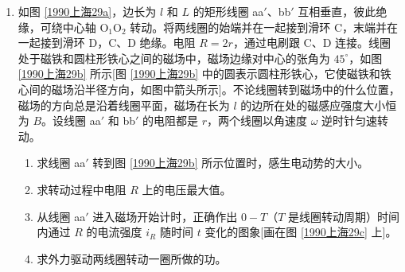 \documentclass[\gkver]{gaokaozhenti}
\begin{document}
\begin{enumerate}
\item
如图 \ref{1990上海29a}，边长为 $l$ 和 $L$ 的矩形线圈 aa$'$、bb$'$ 互相垂直，彼此绝缘，可绕中心轴 O$_{1}$O$_{2}$ 转动。将两线圈的始端并在一起接到滑环 C，末端并在一起接到滑环 D，C、D 绝缘。电阻 $R=2r$，通过电刷跟 C、D 连接。线圈处于磁铁和圆柱形铁心之间的磁场中，磁场边缘对中心的张角为 $45^{\circ}$，如图 \ref{1990上海29b} 所示[图 \ref{1990上海29b} 中的圆表示圆柱形铁心，它使磁铁和铁心间的磁场沿半径方向，如图中箭头所示]。不论线圈转到磁场中的什么位置，磁场的方向总是沿着线圈平面，磁场在长为 $l$ 的边所在处的磁感应强度大小恒为 $B$。设线圈 aa$'$ 和 bb$'$ 的电阻都是 $r$，两个线圈以角速度 $\omega$ 逆时针匀速转动。
\begin{enumerate}
	\item
	求线圈 aa$'$ 转到图 \ref{1990上海29b} 所示位置时，感生电动势的大小。
	\item
	求转动过程中电阻 $R$ 上的电压最大值。
	\item
	从线圈 aa$'$ 进入磁场开始计时，正确作出 $0-T$（$T$ 是线圈转动周期）时间内通过 $R$ 的电流强度 $i_{R}$ 随时间 $t$ 变化的图象[画在图 \ref{1990上海29c} 上]。
	\item
	求外力驱动两线圈转动一圈所做的功。
\end{enumerate}
\threepicture[labelA=1990上海29a, labelB=1990上海29b, labelC=1990上海29c, align=right, hA=5.24cm, wB=4.30cm, wC=4.30cm]
{}
{}
{}
\end{enumerate}
\end{document}
